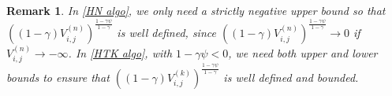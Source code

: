 \documentclass[11pt]{article}
\numberwithin{equation}{section}
\numberwithin{algorithm}{section}
\newtheorem{remark}[remark]{Remark}
\newcommand{\lc}{\left(}
\newcommand{\rc}{\right)}
\newcommand{\eps}{\varepsilon}
\newcommand{\g}{\gamma}
\newcommand{\p}{\psi}
\theoremstyle{plain}
\begin{document}
\begin{remark}
In \cref{HN algo}, we only need a strictly negative upper bound so that $\lc(1-\g){V}^{(n)}_{i,j}\rc^{\frac{1-\g \p}{1-\g}}$ is well defined, since $\lc(1-\g){V}^{(n)}_{i,j}\rc^{\frac{1-\g \p}{1-\g}}\to 0 $ if ${V}^{(n)}_{i,j}\to -\infty$. In \cref{HTK algo}, with $1-\g \psi<0$, we need both upper and lower bounds to ensure that $\lc(1-\g){V}^{(k)}_{i,j}\rc^{\frac{1-\g \p}{1-\g}}$ is well defined and bounded.
\end{remark}

\end{document}
